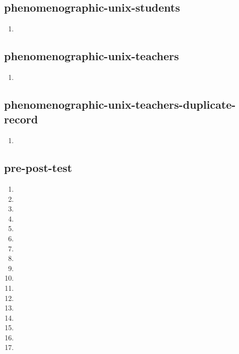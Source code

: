 \documentclass{article}
\begin{document}
\subsection{phenomenographic-unix-students}
\begin{enumerate}
\item {}
\end{enumerate}

\subsection{phenomenographic-unix-teachers}
\begin{enumerate}
\item {}
\end{enumerate}

\subsection{phenomenographic-unix-teachers-duplicate-record}
\begin{enumerate}
\item {}
\end{enumerate}

\subsection{pre-post-test}
\begin{enumerate}
\item {}
\item {}
\item {}
\item {}
\item {}
\item {}
\item {}
\item {}
\item {}
\item {}
\item {}
\item {}
\item {}
\item {}
\item {}
\item {}
\item {}
\end{enumerate}
\end{document}
